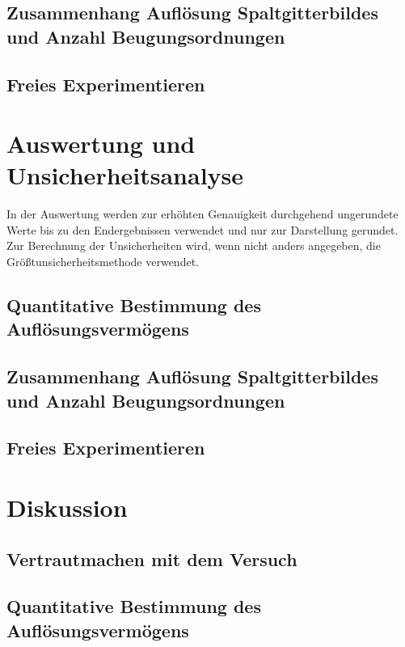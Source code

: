 \documentclass[12pt,a4paper,twoside]{article}
\begin{document}
\subsection{Zusammenhang Auflösung Spaltgitterbildes und Anzahl Beugungsordnungen}
\subsection{Freies Experimentieren}


\section{Auswertung und Unsicherheitsanalyse} %

In der Auswertung werden zur erhöhten Genauigkeit durchgehend ungerundete Werte bis zu den Endergebnissen verwendet und nur zur Darstellung gerundet. \\
Zur Berechnung der Unsicherheiten wird, wenn nicht anders angegeben, die Größtunsicherheitsmethode verwendet.


\subsection{Quantitative Bestimmung des Auflösungsvermögens}
\subsection{Zusammenhang Auflösung Spaltgitterbildes und Anzahl Beugungsordnungen}
\subsection{Freies Experimentieren}



\section{Diskussion} %

\subsection{Vertrautmachen mit dem Versuch}
\subsection{Quantitative Bestimmung des Auflösungsvermögens}
\end{document}
